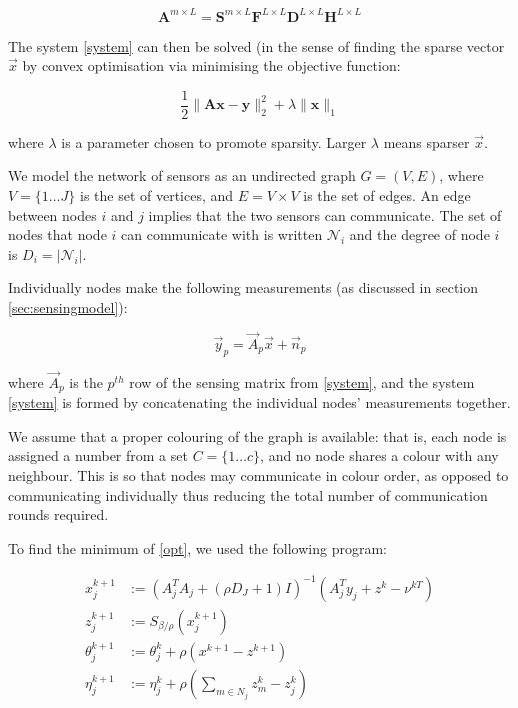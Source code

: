 \documentclass{article}
\begin{document}
\begin{equation}
\textbf{A}^{m\times L} = \textbf{S}^{m\times L} \textbf{F}^{L\times L} \textbf{D}^{L \times L} \textbf{H}^{L \times L}
\end{equation}

The system  \ref{system} can then be solved (in the sense of finding the sparse vector \(\vec{x}\) by convex optimisation via minimising the objective function:

\begin{equation}
\frac{1}{2}\|\textbf{Ax}-\textbf{y}\|_2^2 + \lambda \|\textbf{x}\|_1
\label{opt}
\end{equation}

where \(\lambda\) is a parameter chosen to promote sparsity. Larger \(\lambda\) means sparser \(\vec{x}\). 

We model the network of sensors as an undirected graph \(G = \left(V,E\right)\), where \(V = \{1 \ldots J\}\) is the set of vertices, and \(E = V \times V\) is the set of edges. An edge between nodes \(i\) and \(j\) implies that the two sensors can communicate. The set of nodes that node \(i\) can communicate with is written \(\mathcal{N}_i\) and the degree of node \(i\) is \(D_i = |\mathcal{N}_i|\). 

Individually nodes make the following measurements (as discussed in section \ref{sec:sensingmodel}):

\begin{equation}
\vec{y}_p = \vec{A}_p\vec{x} + \vec{n}_p
\end{equation}

where \(\vec{A}_p\) is the \(p^{th} \) row of the sensing matrix from \eqref{system}, and the system \eqref{system} is formed by concatenating the individual nodes' measurements together.

We assume that a proper colouring of the graph is available: that is, each node is assigned a number from a set \(C = \{1 \ldots c \} \), and no node shares a colour with any neighbour. This is so that nodes may communicate in colour order, as opposed to communicating individually thus reducing the total number of communication rounds required. 

To find the minimum of \ref{opt}, we used the following program:

\begin{thm}
\begin{align}
x_j^{k+1} &:= \left(A_j^TA_j + (\rho D_J + 1) I\right)^{-1}\left(A_j^Ty_j +  z^k - \nu^{kT}\right)\\
z_j^{k+1} &:= S_{\beta/\rho}\left(x_j^{k+1} \right)
 \\
\theta_j^{k+1} &:= \theta_j^{k} + \rho \left(x^{k+1}-z^{k+1}\right) \\
\eta_j^{k+1} &:= \eta_j^k + \rho\left(\sum_{m \in N_j} z_m^k - z_j^k\right)
\label{dadmm_algo_lasso}
\end{align}
\end{thm}
\end{document}
